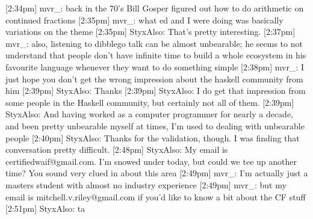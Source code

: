 \documentclass{beamer}
\begin{document}
[2:34pm] mvr_: back in the 70's Bill Gosper figured out how to do arithmetic on continued fractions
[2:35pm] mvr_: what ed and I were doing was basically variations on the theme
[2:35pm] StyxAlso: That’s pretty interesting.
[2:37pm] mvr_: also, listening to dibblego talk can be almost unbearable; he seems to not understand that people don't have infinite time to build a whole ecosystem in his favourite language whenever they want to do something simple
[2:38pm] mvr_: I just hope you don't get the wrong impression about the haskell community from him
[2:39pm] StyxAlso: Thanks 
[2:39pm] StyxAlso: I do get that impression from some people in the Haskell community, but certainly not all of them.
[2:39pm] StyxAlso: And having worked as a computer programmer for nearly a decade, and been pretty unbearable myself at times, I’m used to dealing with unbearable people
[2:40pm] StyxAlso: Thanks for the validation, though. I was finding that conversation pretty difficult.
[2:48pm] StyxAlso: My email is certifiedwaif@gmail.com. I’m snowed under today, but could we tee up another time? You sound very clued in about this area 
[2:49pm] mvr_: I'm actually just a masters student with almost no industry experience
[2:49pm] mvr_: but my email is mitchell.v.riley@gmail.com if you'd like to know a bit about the CF stuff
[2:51pm] StyxAlso: ta
\end{document}
